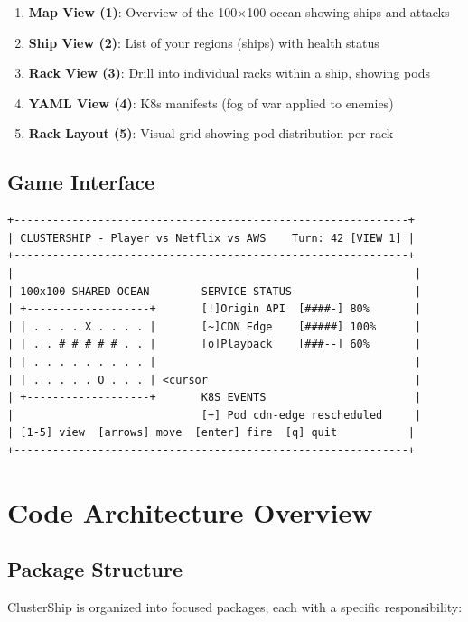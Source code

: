 \documentclass[11pt]{article}
\begin{document}
\begin{enumerate}
    \item \textbf{Map View (1)}: Overview of the 100$\times$100 ocean showing ships and attacks
    \item \textbf{Ship View (2)}: List of your regions (ships) with health status
    \item \textbf{Rack View (3)}: Drill into individual racks within a ship, showing pods
    \item \textbf{YAML View (4)}: K8s manifests (fog of war applied to enemies)
    \item \textbf{Rack Layout (5)}: Visual grid showing pod distribution per rack
\end{enumerate}

\subsection{Game Interface}

\begin{verbatim}
+-------------------------------------------------------------+
| CLUSTERSHIP - Player vs Netflix vs AWS    Turn: 42 [VIEW 1] |
+-------------------------------------------------------------+
|                                                              |
| 100x100 SHARED OCEAN        SERVICE STATUS                   |
| +-------------------+       [!]Origin API  [####-] 80%       |
| | . . . . X . . . . |       [~]CDN Edge    [#####] 100%      |
| | . . # # # # # . . |       [o]Playback    [###--] 60%       |
| | . . . . . . . . . |                                        |
| | . . . . . O . . . | <cursor                                |
| +-------------------+       K8S EVENTS                       |
|                             [+] Pod cdn-edge rescheduled     |
| [1-5] view  [arrows] move  [enter] fire  [q] quit           |
+-------------------------------------------------------------+
\end{verbatim}


\section{Code Architecture Overview}


\subsection{Package Structure}

ClusterShip is organized into focused packages, each with a specific responsibility:
\end{document}
